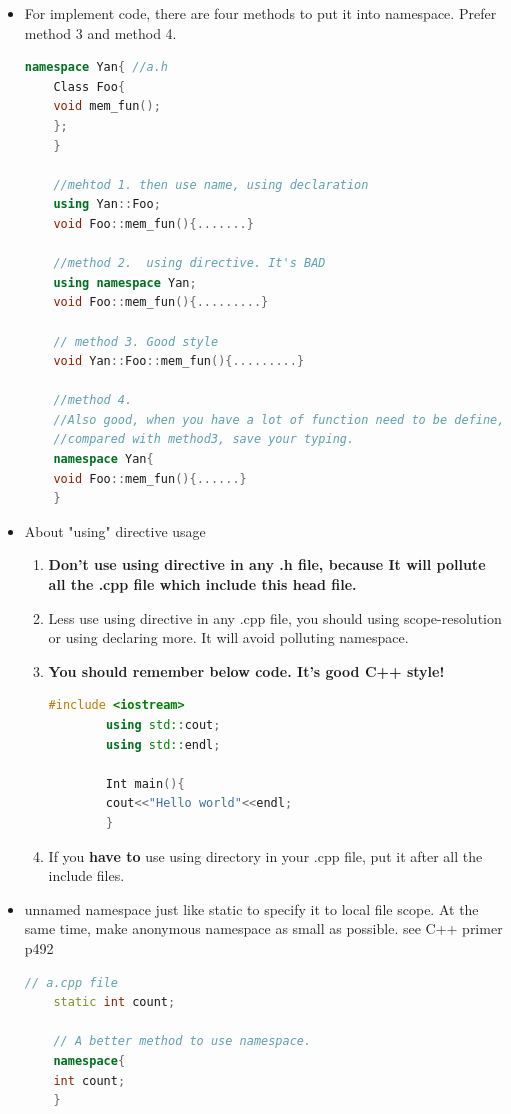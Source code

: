 \documentclass[a4paper,11pt,twoside]{book}
\begin{document}
\begin{itemize}
	
	\item For implement code, there are four methods to put it into namespace. Prefer method 3 and method 4.
	
	\begin{lstlisting}[frame=single, language=c++]
	namespace Yan{ //a.h
	Class Foo{
	void mem_fun();
	};
	}
	
	//mehtod 1. then use name, using declaration
	using Yan::Foo;
	void Foo::mem_fun(){.......}
	
	//method 2.  using directive. It's BAD
	using namespace Yan;
	void Foo::mem_fun(){.........}
	
	// method 3. Good style
	void Yan::Foo::mem_fun(){.........}
	
	//method 4.
	//Also good, when you have a lot of function need to be define,
	//compared with method3, save your typing.
	namespace Yan{
	void Foo::mem_fun(){......}
	}
	\end{lstlisting}
	
	\item About "using" directive usage
	\begin{enumerate}
		\item  \textbf{Don't use using directive in any .h file,  because It will pollute all the .cpp file which include this head file.}
		
		\item  Less use using directive in any .cpp file, you should using scope-resolution or using declaring more. It will avoid polluting namespace.
		
		\item \textbf{You should remember below code. It's good C++ style!} 
		\begin{lstlisting}[frame=single, language=c++]
		#include <iostream>
		using std::cout;
		using std::endl;
		
		Int main(){
		cout<<"Hello world"<<endl;
		}
		\end{lstlisting}
		
		\item If you \textbf{have to} use using directory in your .cpp file, put it after all the include files.
	\end{enumerate}
	
	\item unnamed namespace just like static to specify it to local file scope. At the same time, make anonymous namespace as small as possible.  see C++ primer p492
	
	\begin{lstlisting}[frame=single, language=c++]
	// a.cpp file
	static int count;
	
	// A better method to use namespace.
	namespace{
	int count;
	}
	\end{lstlisting}
	
\end{itemize}
\end{document}

